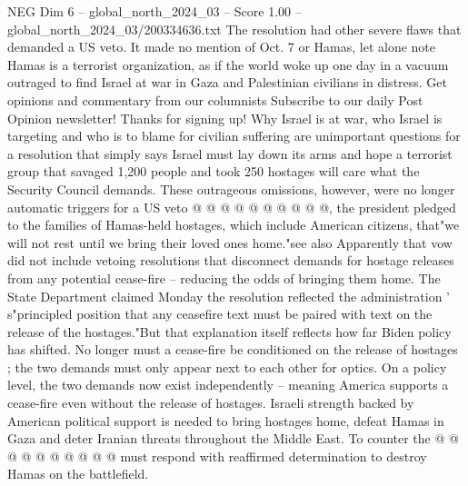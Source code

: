 \begin{textsample}{NEG Dim 6 – global\_north\_2024\_03 – Score 1.00 – global\_north\_2024\_03/200334636.txt}
The resolution had other severe flaws that demanded a US veto.
It made no mention of Oct. 7 or Hamas, let alone note Hamas is a terrorist organization, as if the world woke up one day in a vacuum outraged to find Israel at war in Gaza and Palestinian civilians in distress.
Get opinions and commentary from our columnists Subscribe to our daily Post Opinion newsletter!
Thanks for signing up!
Why Israel is at war, who Israel is targeting and who is to blame for civilian suffering are unimportant questions for a resolution that simply says Israel must lay down its arms and hope a terrorist group that savaged 1,200 people and took 250 hostages will care what the Security Council demands.
These outrageous omissions, however, were no longer automatic triggers for a US veto @ @ @ @ @ @ @ @ @ @, the president pledged to the families of Hamas-held hostages, which include American citizens, that"we will not rest until we bring their loved ones home."see also Apparently that vow did not include vetoing resolutions that disconnect demands for hostage releases from any potential cease-fire -- reducing the odds of bringing them home.
The State Department claimed Monday the resolution reflected the administration ' s"principled position that any ceasefire text must be paired with text on the release of the hostages."But that explanation itself reflects how far Biden policy has shifted.
No longer must a cease-fire be conditioned on the release of hostages ; the two demands must only appear next to each other for optics.
On a policy level, the two demands now exist independently -- meaning America supports a cease-fire even without the release of hostages.
Israeli strength backed by American political support is needed to bring hostages home, defeat Hamas in Gaza and deter Iranian threats throughout the Middle East.
To counter the @ @ @ @ @ @ @ @ @ @ must respond with reaffirmed determination to destroy Hamas on the battlefield.

\end{textsample}
